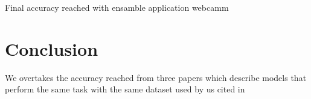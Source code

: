 \documentclass[10pt,twocolumn,letterpaper]{article}
\begin{document}
Final accuracy reached with ensamble
application webcamm

\section{Conclusion}

We overtakes the accuracy reached from three papers which describe models that perform the same task with the same dataset used by us cited in \cite{paper}





{\small
   
   
}
\end{document}
